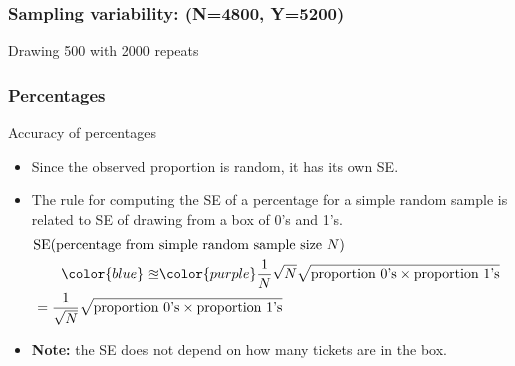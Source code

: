 \documentclass[handout]{beamer}
\begin{document}


   \begin{frame}
   \frametitle{Sampling variability: (N=4800, Y=5200)}
   \begin{center}
   \end{center}
   Drawing 500 with 2000 repeats
   \end{frame}


   \begin{frame} \frametitle{Percentages}

   \begin{block}
   {Accuracy of percentages}
   \begin{itemize}
   \item Since the observed proportion is random, it has its own SE.
   \item The rule for computing the SE of a percentage
   for a simple random sample is related to SE of drawing
   from a box of 0's and 1's.
   $$
   \begin{aligned}
   \lefteqn{\text{SE(percentage from simple random sample size $N$)}} \\
   & \qquad {\color{blue} \approxeq} {\color{purple} \frac{1}{N} } \sqrt{N} \sqrt{\text{proportion 0's} \times \text{proportion 1's}} \\
   &= \frac{1}{\sqrt{N}} \sqrt{\text{proportion 0's} \times \text{proportion 1's}}
   \end{aligned}
   $$

   \item {\bf Note:} the SE does not depend on how many tickets are in the box.
   \end{itemize}
   \end{block}
   \end{frame}

\end{document}
